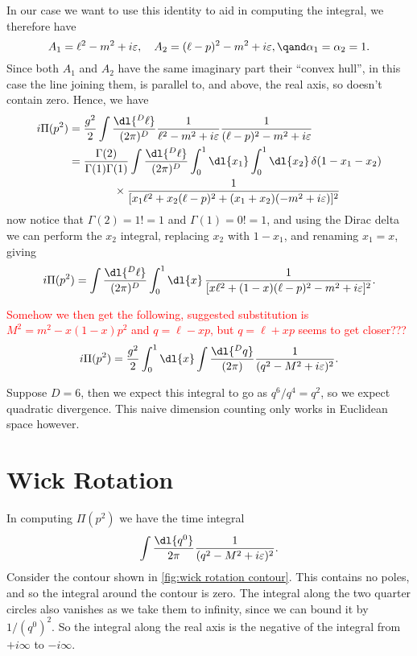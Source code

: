 \documentclass[fleqn]{NotesClass}
\begin{document}
    In our case we want to use this identity to aid in computing the integral, we therefore have
    \begin{equation}
        A_1 = \ell^2 - m^2 + i\varepsilon, \quad A_2 = (\ell - p)^2 - m^2 + i\varepsilon, \qand \alpha_1 = \alpha_2 = 1.
    \end{equation}
    Since both \(A_1\) and \(A_2\) have the same imaginary part their \enquote{convex hull}, in this case the line joining them, is parallel to, and above, the real axis, so doesn't contain zero.
    Hence, we have
    \begin{align}
        i\Pi(p^2) &= \frac{g^2}{2} \int \frac{\dl{^D\ell}}{(2\pi)^D} \frac{1}{\ell^2 - m^2 + i\varepsilon} \frac{1}{(\ell - p)^2 - m^2 + i\varepsilon}\\
        &= \frac{\Gamma(2)}{\Gamma(1)\Gamma(1)} \int \frac{\dl{^D\ell}}{(2\pi)^D} \int_0^1 \dl{x_1} \int_0^1 \dl{x_2} \, \delta(1 - x_1 - x_2)\\
        &\qquad \qquad \times \frac{1}{[x_1\ell^2 + x_2(\ell - p)^2 + (x_1 + x_2)(-m^2 + i\varepsilon)]^2}\notag
    \end{align}
    now notice that \(\Gamma(2) = 1! = 1\) and \(\Gamma(1) = 0! = 1\), and using the Dirac delta we can perform the \(x_2\) integral, replacing \(x_2\) with \(1 - x_1\), and renaming \(x_1 = x\), giving
    \begin{equation}
        i\Pi(p^2) = \int \frac{\dl{^D\ell}}{(2\pi)^D} \int_0^1 \dl{x} \, \frac{1}{[x\ell^2 + (1 - x)(\ell - p)^2 - m^2 + i\varepsilon]^2}.
    \end{equation}
    
    \textcolor{red}{Somehow we then get the following, suggested substitution is \(M^2 = m^2 - x(1 - x)p^2\) and \(q = \ell - xp\), but \(q = \ell + xp\) seems to get closer???}
    \begin{equation}
        i\Pi(p^2) = \frac{g^2}{2} \int_0^1 \dl{x} \int \frac{\dl{^Dq}}{(2\pi)} \frac{1}{(q^2 - M^2 + i\varepsilon)^2}.
    \end{equation}
    
    Suppose \(D = 6\), then we expect this integral to go as \(q^6/q^4 = q^2\), so we expect quadratic divergence.
    This naive dimension counting only works in Euclidean space however.
    
    \section{Wick Rotation}
    In computing \(\Pi(p^2)\) we have the time integral
    \begin{equation}
        \int \frac{\dl{q^0}}{2\pi} \frac{1}{(q^2 - M^2 + i\varepsilon)^2}.
    \end{equation}
    Consider the contour shown in \cref{fig:wick rotation contour}.
    This contains no poles, and so the integral around the contour is zero.
    The integral along the two quarter circles also vanishes as we take them to infinity, since we can bound it by \(1/(q^0)^2\).
    So the integral along the real axis is the negative of the integral from \(+i\infty\) to \(-i\infty\).
    
\end{document}
